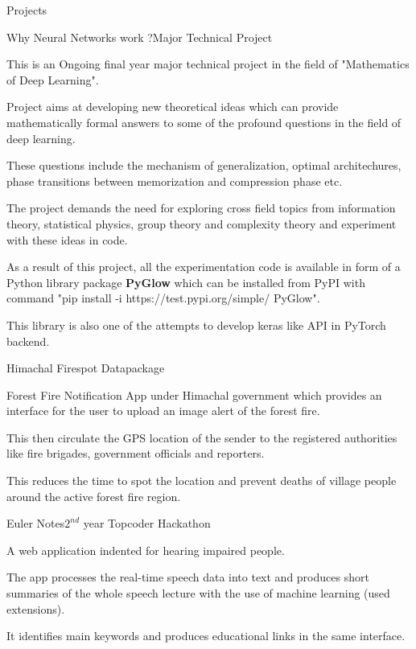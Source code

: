 \documentclass{resume} %
\begin{document}
\begin{rSection}{Projects}

\begin{rSubsection}{Why Neural Networks work ?}{Major Technical Project}{}{}
\item This is an Ongoing final year major technical project in the field of "Mathematics of Deep Learning".
\item Project aims at developing new theoretical ideas which can provide mathematically formal answers to some of the profound questions in the field of deep learning.
\item These questions include the mechanism of generalization, optimal architechures, phase transitions between memorization and compression phase etc.
\item The project demands the need for exploring cross field topics from information theory, statistical physics, group theory and complexity theory and experiment with these ideas in code.
\item As a result of this project, all the experimentation code is available in form of a Python library package \textbf{PyGlow} which can be installed from PyPI with command "pip install -i https://test.pypi.org/simple/ PyGlow".
\item This library is also one of the attempts to develop keras like API in PyTorch backend.
\end{rSubsection}

\begin{rSubsection}{Himachal Firespot Datapackage}{}{}{}
\item Forest Fire Notification App under Himachal government which provides an interface for the user to
upload an image alert of the forest fire. 
\item This then circulate the GPS location of the sender  to the registered authorities like fire brigades, government officials and reporters. 
\item This reduces the time to spot the location and prevent deaths of village people around the active forest fire region. 
\end{rSubsection}

\begin{rSubsection}{Euler Notes}{$2^{nd}$ year Topcoder Hackathon}{}{}
\item A web application indented for hearing impaired people. 
\item The app processes the real-time speech data into text and produces short summaries of the whole speech lecture with the use of machine learning (used extensions). 
\item It identifies main keywords and produces educational links in the same interface.
\end{rSubsection}

\end{rSection}
\end{document}
